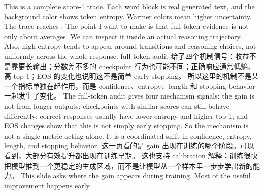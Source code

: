 {}\markdownRendererInterblockSeparator
{}This is a complete score-1 trace. Each word block is real generated text, and the background color shows token entropy. Warmer colors mean higher uncertainty.\markdownRendererInterblockSeparator
{}The trace reaches . The point I want to make is that full-token evidence is not only about averages. We can inspect it inside an actual reasoning trajectory. Also, high entropy tends to appear around transitions and reasoning choices, not uniformly across the whole response.\markdownRendererInterblockSeparator
{}\markdownRendererHorizontalRule{}\markdownRendererInterblockSeparator
{}\markdownRendererInterblockSeparator
{}\markdownRendererInterblockSeparator
{}full-token audit 给了四个机制信号：收益不是靠更长输出；分数差不多的 checkpoint 行为也可能不同；正确响应通常低熵、高 top-1；EOS 的变化也说明这不是简单 early stopping。\markdownRendererInterblockSeparator
{}所以这里的机制不是某一个指标单独在起作用，而是 confidence、entropy、length 和 stopping behavior 一起发生了变化。\markdownRendererInterblockSeparator
{}\markdownRendererInterblockSeparator
{}The full-token audit gives four mechanism signals: the gain is not from longer outputs; checkpoints with similar scores can still behave differently; correct responses usually have lower entropy and higher top-1; and EOS changes show that this is not simply early stopping.\markdownRendererInterblockSeparator
{}So the mechanism is not a single metric acting alone. It is a coordinated shift in confidence, entropy, length, and stopping behavior.\markdownRendererInterblockSeparator
{}\markdownRendererHorizontalRule{}\markdownRendererInterblockSeparator
{}\markdownRendererInterblockSeparator
{}\markdownRendererInterblockSeparator
{}这一页看的是 gain 出现在训练的哪个阶段。可以看到，大部分有效提升都出现在训练早期。\markdownRendererInterblockSeparator
{}这也支持 calibration 解释：训练很快把模型推到一个更稳定的生成区域，而不是让模型从一个样本里一步步学出新的能力。\markdownRendererInterblockSeparator
{}\markdownRendererInterblockSeparator
{}This slide asks where the gain appears during training. Most of the useful improvement happens early.\markdownRendererInterblockSeparator

